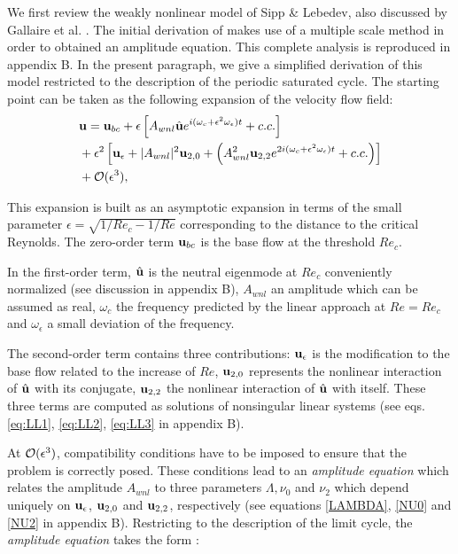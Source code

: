 \documentclass[twocolumn,10pt]{asme2ej}
\newcommand{\be}[1]{ \begin{equation} \label{#1}}
\newcommand{\ee}{\end{equation}}
\begin{document}
We first review the weakly nonlinear model of Sipp \& 
Lebedev\cite{SippLebedev}, also discussed by Gallaire et al. \cite{FDR2016}.  
The initial derivation of \cite{SippLebedev} makes use of a multiple scale method in order to obtained an amplitude equation.
This complete analysis is reproduced in appendix B. In the present paragraph, we give a simplified derivation of this model restricted to the description of the periodic saturated cycle.
The starting point can be taken as the following expansion of the velocity flow field:
\be{WNL1}
\begin{aligned}
&{\bf u} = {}  {\bf u}_{bc} + \epsilon \left[ A_{wnl}  \hat{\bf u} e^{i (\omega_c+\epsilon^2 \omega_\epsilon)  t} + c.c. \right]\\
&+ \epsilon^2 \left[ {\bf u}_\epsilon + |A_{wnl}|^2  {\bf u}_{2,0} + \left(  A_{wnl}^2 {\bf u}_{2,2} e^{2 i(\omega_c+\epsilon^2 \omega_\epsilon)  t} + c.c. \right) \right]\\
& + {\cal O}( \epsilon ^3),
\end{aligned}
\ee



This expansion is built as an asymptotic expansion in terms of the small parameter $\epsilon = \sqrt{1/Re_c - 1/Re}$ corresponding to the distance to the critical Reynolds. 
The zero-order term ${\bf u}_{bc}$ is the base flow at the threshold $Re_c$.

In the first-order term, $\hat{\bf u}$ is the neutral eigenmode at $Re_c$ conveniently normalized (see discussion in appendix B), 
$A_{wnl}$ an amplitude which can be assumed as real, $\omega_c$ the frequency predicted by the linear approach at $Re=Re_c$ and $\omega_\epsilon$ a small deviation of the frequency. 

The second-order term contains three contributions: ${\bf u}_{\epsilon}$ is the modification to the base flow related to the 
increase of $Re$, ${\bf u}_{2,0}$  represents the nonlinear interaction of $\hat{\bf u}$ with its conjugate, ${\bf u}_{2,2}$ the nonlinear 
interaction of $\hat{\bf u}$ with itself. These three terms are computed as solutions of nonsingular linear systems 
(see eqs. \ref{eq:LL1}, \ref{eq:LL2}, \ref{eq:LL3} in appendix B).

At ${\cal O}( \epsilon ^3)$, compatibility conditions have to be imposed to ensure that the problem is correctly posed. These conditions lead to an {\em amplitude equation} which relates the amplitude $ A_{wnl}$ to three parameters $\Lambda, \nu_{0}$ and $\nu_{2}$ which depend
uniquely on ${\bf u}_\epsilon$, ${\bf u}_{2,0}$ and ${\bf u}_{2,2}$, respectively (see equations \ref{LAMBDA}, \ref{NU0} and \ref{NU2} in appendix B). Restricting to the description of the limit cycle, the {\em amplitude equation} takes the form :
\end{document}
